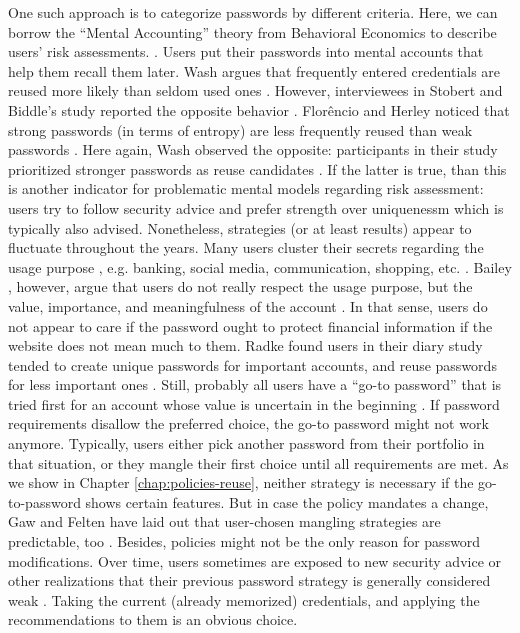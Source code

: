 	One such approach is to categorize passwords by different criteria. Here, we can borrow the ``Mental Accounting'' theory from Behavioral Economics to describe users' risk assessments. \cite{Stockinger2015TowardsBE,Thaler2004}. Users put their passwords into mental accounts that help them recall them later. 
	Wash \etal argues that frequently entered credentials are reused more likely than seldom used ones \cite{Wash2016UnderstandingPasswordChoices}. However, interviewees in Stobert and Biddle's study reported the opposite behavior \cite{Stobert2014PasswordLifeCycle}. 
	Florêncio and Herley noticed that strong passwords (in terms of entropy) are less frequently reused than weak passwords \cite{Florencio2007LargeScaleStudyPasswordHabits}. Here again, Wash \etal observed the opposite: participants in their study prioritized stronger passwords as reuse candidates \cite{Wash2016UnderstandingPasswordChoices}. If the latter is true, than this is another indicator for problematic mental models regarding risk assessment: users try to follow security advice and prefer strength over uniquenessm which is typically also advised. Nonetheless, strategies (or at least results) appear to fluctuate throughout the years. 
	Many users cluster their secrets regarding the usage purpose \cite{Haque2014Hierarchy}, e.g. banking, social media, communication, shopping, etc. \cite{Notoatmodjo2007ExploringWeakestLink,Stobert2014PWMThatDoesntRemember}. Bailey \etal, however, argue that users do not really respect the usage purpose, but the value, importance, and meaningfulness of the account \cite{Bailey2014StatisticsReuse}. In that sense, users do not appear to care if the password ought to protect financial information if the website does not mean much to them. Radke \etal found users in their diary study tended to create unique passwords for important accounts, and reuse passwords for less important ones \cite{Radke2013WhoDecides}. Still, probably all users have a ``go-to password'' that is tried first for an account whose value is uncertain in the beginning \cite{Stobert2014PasswordLifeCycle}. 
	If password requirements disallow the preferred choice, the go-to password might not work anymore. Typically, users either pick another password from their portfolio in that situation, or they mangle their first choice until all requirements are met. As we show in Chapter \ref{chap:policies-reuse}, neither strategy is necessary if the go-to-password shows certain features. But in case the policy mandates a change, Gaw and Felten have laid out that user-chosen mangling strategies are predictable, too \cite{Gaw2006PasswordManagement}. Besides, policies might not be the only reason for password modifications. Over time, users sometimes are exposed to new security advice or other realizations that their previous password strategy is generally considered weak \cite{VonZezschwitz2013SurvivalShortest}. Taking the current (already memorized) credentials, and applying the recommendations to them is an obvious choice. 
		
